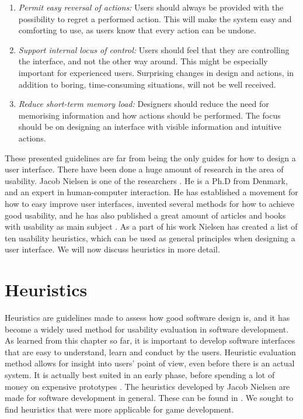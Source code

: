 \begin{enumerate}[{e}.1]
\item \emph{Permit easy reversal of actions:} Users should always be provided with the possibility to regret a performed action. This will make the system easy and comforting to use, as users know that every action can be undone. 
\item \emph{Support internal locus of control:} Users should feel that they are controlling the interface, and not the other way around. This might be especially important for experienced users. Surprising changes in design and actions, in addition to boring, time-consuming situations, will not be well received. 
\item \emph{Reduce short-term memory load:} Designers should reduce the need for memorising information and how actions should be performed. The focus should be on designing an interface with visible information and intuitive actions.
\end{enumerate}

These presented guidelines are far from being the only guides for how to design a user interface. There have been done a huge amount of research in the area of usability. Jacob Nielsen is one of the researchers \cite{nielsen2005ten}. He is a Ph.D from Denmark, and an expert in human-computer interaction. He has established a movement for how to easy improve user interfaces, invented several methods for how to achieve good usability, and he has also published a great amount of articles and books with usability as main subject \cite{JNielsen}. As a part of his work Nielsen has created a list of ten usability heuristics, which can be used as general principles when designing a user interface\cite{nielsen2005ten}. We will now discuss heuristics in more detail.

\section{Heuristics}
\label{sec:heur}
Heuristics are guidelines made to assess how good software design is, and it has become a widely used method for usability evaluation in software development. As learned from this chapter so far, it is important to develop software interfaces that are easy to understand, learn and conduct by the users. Heuristic evaluation method allows for insight into users' point of view, even before there is an actual system. It is actually best suited in an early phase, before spending a lot of money on expensive prototypes \cite{desurvire}. The heuristics developed by Jacob Nielsen are made for software development in general. These can be found in \cite{nielsen2005ten}. We sought to find heuristics that were more applicable for game development. 

